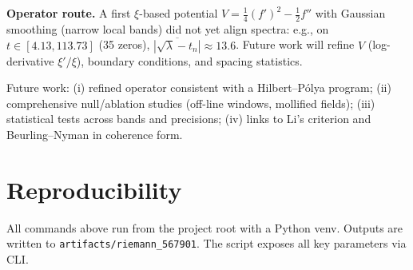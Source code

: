 \documentclass[10pt]{article}
\begin{document}
\textbf{Operator route.} A first $\xi$-based potential $V=\tfrac14(f')^2 - \tfrac12 f''$ with Gaussian smoothing (narrow local bands) did not yet align spectra: e.g., on $t\in[4.13,113.73]$ (35 zeros), $\overline{|\sqrt{\lambda}-t_n|}\approx 13.6$. Future work will refine $V$ (log-derivative $\xi'/\xi$), boundary conditions, and spacing statistics.

Future work: (i) refined operator consistent with a Hilbert--Pólya program; (ii) comprehensive null/ablation studies (off-line windows, mollified fields); (iii) statistical tests across bands and precisions; (iv) links to Li's criterion and Beurling--Nyman in coherence form.

\section*{Reproducibility}
All commands above run from the project root with a Python venv. Outputs are written to \texttt{artifacts/riemann\_567901}. The script exposes all key parameters via CLI.
\end{document}
